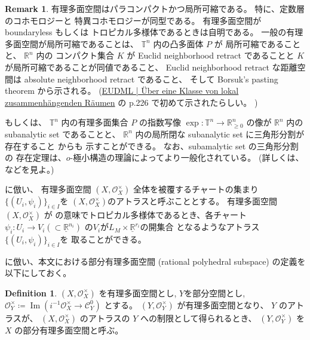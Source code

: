 \documentclass[a4paper,dvipdfmx,reqno,12pt]{amsart}
\theoremstyle{definition}
\newtheorem{definition}[theorem]{Definition}
\newtheorem{remark}[theorem]{Remark}
\newcommand{\deq}{\coloneqq}
\newcommand{\opn}[1]{\operatorname{#1}}
\numberwithin{equation}{section}
\begin{document}
\begin{remark}
有理多面空間はパラコンパクトかつ局所可縮である。
特に、定数層のコホモロジーと
特異コホモロジーが同型である。
有理多面空間が
boundaryless もしくは
トロピカル多様体であるときは自明である。
一般の有理多面空間が局所可縮であることは、
$\mathbb{T}^{n}$ 内の凸多面体 $P$ が
局所可縮であることと、
$\mathbb{R}^{n}$ 内の コンパクト集合 $K$ が Euclid 
neighborhood retract であることと
$K$が局所可縮であることが同値であること、
Euclid neighborhood retract な距離空間は
absolute neighborhood retract であること、
そして Borsuk's pasting theorem から示される。
(\href{https://eudml.org/doc/212574}{EUDML | Über eine Klasse von lokal zusammenhängenden Räumen}
の p.226 で初めて示されたらしい。
)

もしくは、
$\mathbb{T}^{n}$ 内の有理多面集合 $P$ の指数写像
$\opn{exp}\colon \mathbb{T}^{n}\to 
\mathbb{R}^{n}_{\geq 0}$ の像が $\mathbb{R}^{n}$
内の subanalytic set であることと、
$\mathbb{R}^{n}$ 内の局所閉な
subanalytic set に三角形分割が存在すること
\cite{MR760983} からも
示すことができる。
なお、subamalytic set の三角形分割の
存在定理は、$o$-極小構造の理論によってより一般化されている。
(詳しくは、\cite[Theorem II]{MR1463945} などを見よ。)
\end{remark}

\cite{demedrano2023chern}に倣い、
有理多面空間 $(X,\mathcal{O}_X^{\times})$
全体を被覆するチャートの集まり
$\{(U_i,\psi_i)\}_{i\in I}$を
$(X,\mathcal{O}_X^{\times})$のアトラスと呼ぶこととする。
有理多面空間$(X,\mathcal{O}_X^{\times})$ が
\cite[Definition 6.1]{gross2019sheaftheoretic}
の意味でトロピカル多様体であるとき、各チャート
$\psi_i\colon U_i\to V_i(\subset \underline{\mathbb{R}}^{n_i})$
の$V_i$が$L_M\times \underline{\mathbb{R}}^{r_i}$の開集合
となるようなアトラス$\{(U_i,\psi_i)\}_{i\in I}$を
取ることができる。

\cite[Definition 2.14]{demedrano2023chern}
に倣い、本文における部分有理多面空間
(rational polyhedral subspace)
の定義を以下にしておく。


\begin{definition}

$(X,\mathcal{O}_X^{\times})$ を有理多面空間とし,
$Y$を部分空間とし, 
$\mathcal{O}^{\times}_{Y}\deq 
\opn{Im}(i^{-1}\mathcal{O}_X^{\times}\to \mathcal{C}_{Y}^{0})$
とする。
$(Y,\mathcal{O}_Y^{\times})$ が有理多面空間となり、
$Y$ のアトラスが、
$(X,\mathcal{O}^{\times}_X)$
のアトラスの $Y$ への制限として得られるとき、
$(Y,\mathcal{O}_Y^{\times})$ を
$X$ の部分有理多面空間と呼ぶ。
\end{definition}
\end{document}
